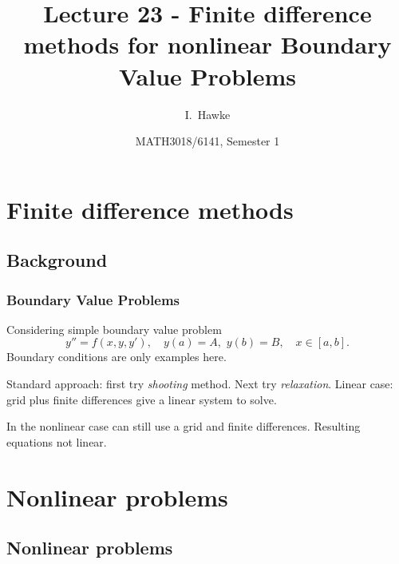 \documentclass{beamer}
\title[Lecture 23] %
{Lecture 23 - Finite difference methods for nonlinear Boundary Value Problems}
\author[I. Hawke] %
{I.~Hawke}
\institute[University of Southampton] %
{
  School of Mathematics, \\
  University of Southampton, UK
}
\date[Semester 1] %
{MATH3018/6141, Semester 1}
\begin{document}
\begin{frame}
  \titlepage
\end{frame}

\section{Finite difference methods}

\subsection{Background}

\begin{frame}
  \frametitle{Boundary Value Problems}

  Considering simple boundary value problem
  \begin{equation*}
    y'' = f(x, y, y'), \quad y(a) = A, \,\, y(b) = B, \quad x \in [a,b].
  \end{equation*} \pause
  Boundary conditions are only examples here. \pause

  \vspace{1ex}

  Standard approach: first try \emph{shooting} method.  Next try \emph{relaxation}. Linear case: grid plus finite differences give a linear system to solve. \pause

  \vspace{1ex}

  In the nonlinear case can still use a grid and finite differences. Resulting equations not linear.

\end{frame}


\section{Nonlinear problems}

\subsection{Nonlinear problems}
\end{document}
